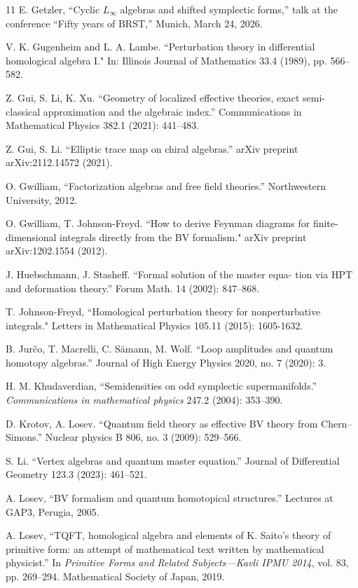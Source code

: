 \documentclass{amsart}
\theoremstyle{plain} %
\theoremstyle{definition}
\theoremstyle{remark}
\begin{document}
\begin{thebibliography}{11}
E. Getzler, ``Cyclic $L_\infty$ algebras and shifted symplectic forms,'' talk at the conference ``Fifty years of BRST,'' Munich, March 24, 2026.

 V. K. Gugenheim and L. A. Lambe. ``Perturbation theory
in diﬀerential homological algebra I." In: Illinois Journal of
Mathematics 33.4 (1989), pp. 566--582.

Z. Gui, S. Li,  K. Xu. ``Geometry of localized effective theories, exact semi-classical approximation and the algebraic index.'' Communications in Mathematical Physics 382.1 (2021): 441--483.

Z. Gui, S. Li. ``Elliptic trace map on chiral algebras.'' arXiv preprint arXiv:2112.14572 (2021).



O. Gwilliam, ``Factorization algebras and free field theories.'' Northwestern University, 2012.

 O. Gwilliam, T. Johnson-Freyd. ``How to derive Feynman diagrams for finite-dimensional integrals directly from the BV formalism." arXiv preprint arXiv:1202.1554 (2012).

J. Huebschmann, J. Stasheﬀ. ``Formal solution of the master equa-
tion via HPT and deformation theory.'' Forum Math. 14 (2002): 847--868.

 T. Johnson-Freyd, ``Homological perturbation theory for nonperturbative integrals." Letters in Mathematical Physics 105.11 (2015): 1605-1632.

B. Jur\v{c}o, T. Macrelli, C. S\"amann, M. Wolf. ``Loop amplitudes and quantum homotopy algebras.'' Journal of High Energy Physics 2020, no. 7 (2020): 3.

H. M. Khudaverdian, ``Semidensities on odd symplectic supermanifolds.'' \textit{Communications in mathematical physics} 247.2 (2004): 353--390.

D. Krotov, A. Losev. ``Quantum field theory as effective BV theory from Chern–Simons.'' Nuclear physics B 806, no. 3 (2009): 529--566.

S. Li. ``Vertex algebras and quantum master equation.'' Journal of Differential Geometry 123.3 (2023): 461--521.

A. Losev, ``BV formalism and quantum homotopical structures.'' Lectures at
GAP3, Perugia, 2005.

A. Losev, ``TQFT, homological algebra and elements of K. Saito's theory of primitive form: an attempt of mathematical text written by mathematical physicist.'' In \textit{Primitive Forms and Related Subjects---Kavli IPMU 2014}, vol. 83, pp. 269--294. Mathematical Society of Japan, 2019.


\end{thebibliography}
\end{document}

